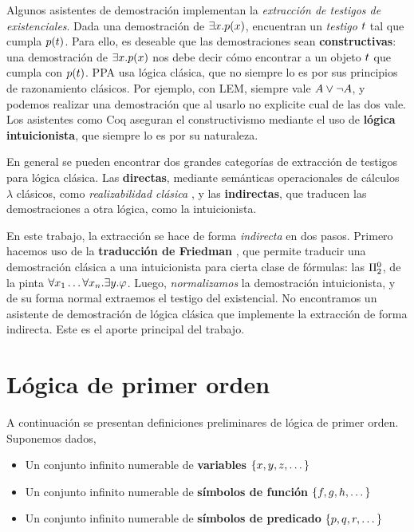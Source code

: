 Algunos asistentes de demostración implementan la \textit{extracción de testigos
de existenciales}. Dada una demostración de $\exists x . p(x)$,
encuentran un \textit{testigo} $t$ tal que cumpla $p(t)$. Para ello,
es deseable que las demostraciones sean \textbf{constructivas}: una demostración
de $\exists x . p(x)$ nos debe decir cómo encontrar a un objeto
$t$ que cumpla con $p(t)$. PPA usa lógica clásica, que no siempre lo
es por sus principios de razonamiento clásicos. Por ejemplo, con LEM, siempre
vale $A \vee \neg A$, y podemos realizar una demostración que al usarlo no explicite cual de las dos vale. Los asistentes como Coq
aseguran el constructivismo mediante el uso de \textbf{lógica intuicionista},
que siempre lo es por su naturaleza.

En general se pueden encontrar dos grandes categorías de extracción de testigos para lógica clásica. Las \textbf{directas}, mediante semánticas operacionales de cálculos $\lambda$ clásicos, como \textit{realizabilidad clásica} \cite{miquel-friedman}, y las \textbf{indirectas}, que traducen las demostraciones a otra lógica, como la intuicionista.

En este trabajo, la extracción se hace de forma \textit{indirecta} en dos pasos.
Primero hacemos uso de la \textbf{traducción de Friedman}
\cite{selinger-friedman}, que permite traducir una demostración clásica a una
intuicionista para cierta clase de fórmulas: las $\Pi^0_{2}$, de la pinta
$\forall x_1 \dots \forall x_n . \exists y . \varphi$. Luego,
\textit{normalizamos} la demostración intuicionista, y de su forma normal
extraemos el testigo del existencial. No encontramos un asistente de
demostración de lógica clásica que implemente la extracción de forma indirecta.
Este es el aporte principal del trabajo.

\section{Lógica de primer orden}

A continuación se presentan definiciones preliminares de lógica de primer orden. Suponemos dados,

\begin{itemize}
    \item Un conjunto infinito numerable de \textbf{variables}
    \(
        \{x, y, z, \dots\}
    \)
    \item Un conjunto infinito numerable de \textbf{símbolos de función}
    \(
        \{f, g, h, \dots\}
    \)
    \item Un conjunto infinito numerable de \textbf{símbolos de predicado}
    \(
        \{p, q, r, \dots\}
    \)
\end{itemize}

